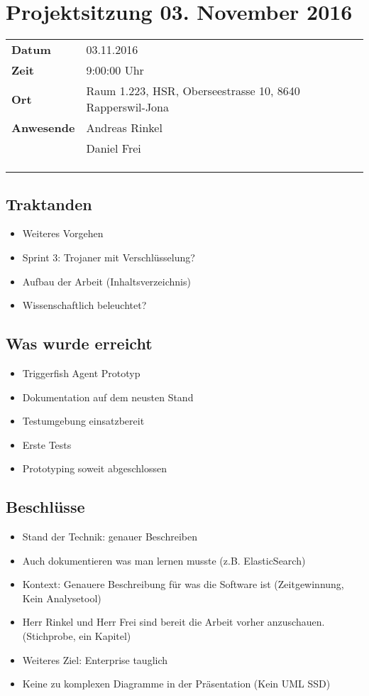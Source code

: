 \documentclass[class=scrbook,crop=false]{standalone}
\begin{document}
	\section{Projektsitzung 03. November 2016}

	\begin{tabular}{ll}
		\textbf{Datum} & 03.11.2016 \\
		\textbf{Zeit} & 9:00\textendash10:00 Uhr \\
		\textbf{Ort} & Raum 1.223, HSR, Oberseestrasse 10, 8640 Rapperswil-Jona \\
		\textbf{Anwesende} & Andreas Rinkel \\ & Daniel Frei \\ & \ibuf \\ & \fbif \\ & \sadf
	\end{tabular}

	\subsection*{Traktanden}
	\begin{itemize}
		\item Weiteres Vorgehen
		\item Sprint 3: Trojaner mit Verschlüsselung?
		\item Aufbau der Arbeit (Inhaltsverzeichnis)
		\item Wissenschaftlich beleuchtet?
	\end{itemize}

	\subsection*{Was wurde erreicht}
	\begin{itemize}
		\item Triggerfish Agent Prototyp
		\item Dokumentation auf dem neusten Stand
		\item Testumgebung einsatzbereit
		\item Erste Tests
		\item Prototyping soweit abgeschlossen
	\end{itemize}

	\subsection*{Beschlüsse}
	\begin{itemize}
		\item Stand der Technik: genauer Beschreiben
		\item Auch dokumentieren was man lernen musste (z.B. ElasticSearch)
		\item Kontext: Genauere Beschreibung für was die Software ist (Zeitgewinnung, Kein Analysetool)
		\item Herr Rinkel und Herr Frei sind bereit die Arbeit vorher anzuschauen. (Stichprobe, ein Kapitel)
		\item Weiteres Ziel: Enterprise tauglich
		\item Keine zu komplexen Diagramme in der Präsentation (Kein UML SSD)
	\end{itemize}
\end{document}
